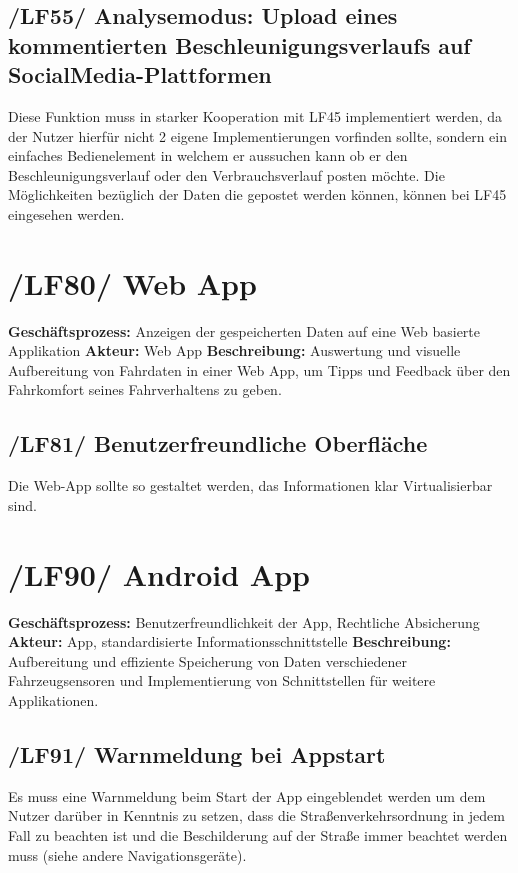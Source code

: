 \subsection{/LF55/ Analysemodus: Upload eines kommentierten Beschleunigungsverlaufs auf SocialMedia-Plattformen}
\newline
Diese Funktion muss in starker Kooperation mit LF45 implementiert werden, da der Nutzer hierfür nicht 2 eigene Implementierungen vorfinden sollte, sondern ein einfaches Bedienelement in welchem er aussuchen kann ob er den Beschleunigungsverlauf oder den Verbrauchsverlauf posten möchte. Die Möglichkeiten bezüglich der Daten die gepostet werden können, können bei LF45 eingesehen werden.
\newpage
\section{/LF80/ Web App}
\textbf{Geschäftsprozess:}	Anzeigen der gespeicherten Daten auf eine Web basierte Applikation  
\newline
\textbf{Akteur:}		Web App
\newline
\textbf{Beschreibung:} Auswertung und visuelle Aufbereitung von Fahrdaten in einer Web App, um Tipps und Feedback über den Fahrkomfort seines Fahrverhaltens zu geben.

\subsection{/LF81/ Benutzerfreundliche Oberfläche}
\newline
Die Web-App sollte so gestaltet werden, das Informationen klar Virtualisierbar sind. 

\newpage
\section{/LF90/ Android App}
\textbf{Geschäftsprozess:}	Benutzerfreundlichkeit der App, Rechtliche Absicherung
\newline
\textbf{Akteur:}		App, standardisierte Informationsschnittstelle
\newline
\textbf{Beschreibung:} Aufbereitung und effiziente Speicherung von Daten verschiedener Fahrzeugsensoren und Implementierung von Schnittstellen für weitere Applikationen. 

\subsection{/LF91/ Warnmeldung bei Appstart}
\newline
Es muss eine Warnmeldung beim Start der App eingeblendet werden um dem Nutzer darüber in Kenntnis zu setzen, dass die Straßenverkehrsordnung in jedem Fall zu beachten ist und die Beschilderung auf der Straße immer beachtet werden muss (siehe andere Navigationsgeräte).

